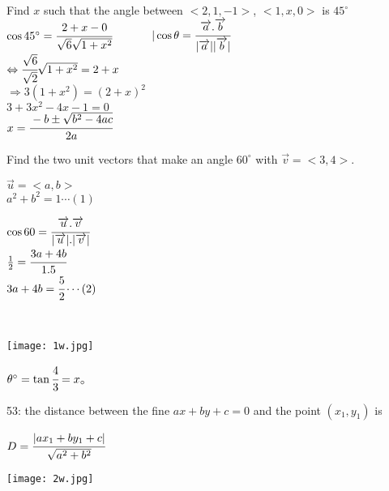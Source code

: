 \begin{example}
Find $x$ such that the angle between $<2,1,-1>$, $<1,x,0>$ is $45^\circ$ \\
$\cos{45^\circ}=\cfrac{2+x-0}{\sqrt{6}\sqrt{1+x^2}}$~~~~~~
$|\cos{\theta}=\cfrac{\overrightarrow{a}.\overrightarrow{b}}{|\overrightarrow{a}||\overrightarrow{b}|}$\\
$\Leftrightarrow\cfrac{\sqrt{6}}{\sqrt{2}}\sqrt{1+x^2}=2+x$\\
$\Rightarrow3(1+x^2)=(2+x)^2$\\
$3+3x^2-4x-1=0$\\
$x=\cfrac{-b\pm\sqrt{b^2-4ac}}{2a}$
\end{example}
\noindent{\color{smalt(darkpowderblue)}\rule{\linewidth}{.2mm}}
\begin{example}
Find the two unit vectors that make an angle $60^\circ$ with $\overrightarrow{v}=<3,4>.$\\
\noindent\begin{minipage}{0.5\textwidth}
$\overrightarrow{u}=<a,b>$\\
$a^2+b^2=1\cdots(1)$\\
\end{minipage}
\noindent\begin{minipage}{0.5\textwidth}
$\cos{60}=\cfrac{\overrightarrow{u}.\overrightarrow{v}}{|\overrightarrow{u}|.|\overrightarrow{v}|}$\\
$\frac{1}{2}=\cfrac{3a+4b}{1.5}$\\
$3a+4b=\cfrac{5}{2}\cdots(2)$\\
\end{minipage}\\
\noindent\begin{minipage}{0.7\textwidth}
\texttt{[image: 1w.jpg]}\\
\end{minipage}
\noindent\begin{minipage}{0.5\textwidth}
$\theta^\circ=\tan\cfrac{4}{3}=x_\circ$\\
\end{minipage}
\end{example}
\noindent{\color{smalt(darkpowderblue)}\rule{\linewidth}{.2mm}}
53: the distance between the fine $ax+by+c=0$ and the point $(x_1,y_1)$ is\\
\noindent\begin{minipage}{0.5\textwidth}
$D=\cfrac{|ax_1+by_1+c|}{\sqrt{a^2+b^2}}$
\end{minipage}
\noindent\begin{minipage}{0.5\textwidth}
\texttt{[image: 2w.jpg]}
\end{minipage}
